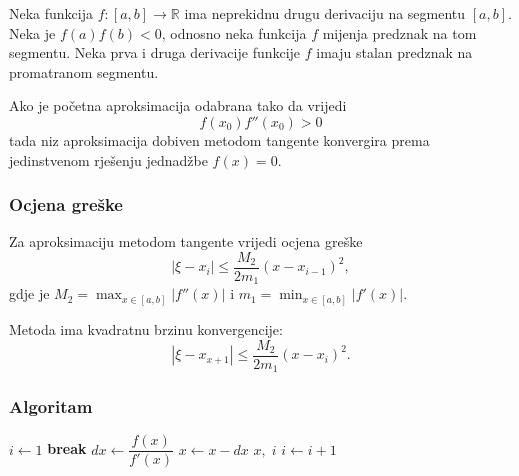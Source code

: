Neka funkcija $f: [a,b] \to \mathbb{R}$ ima neprekidnu drugu derivaciju na
segmentu $[a,b]$. Neka je $f(a)f(b) < 0$, odnosno neka funkcija $f$ mijenja
predznak na tom segmentu.
Neka prva i druga derivacije funkcije $f$ imaju stalan predznak na promatranom
segmentu.

Ako je početna aproksimacija odabrana tako da vrijedi
$$
    f(x_0)f''(x_0) > 0
$$
tada niz aproksimacija dobiven metodom tangente konvergira prema jedinstvenom
rješenju jednadžbe $f(x) = 0$.

\subsubsection{Ocjena greške}

Za aproksimaciju metodom tangente vrijedi ocjena greške
$$
|\xi - x_i| \leq \dfrac{M_2}{2m_1}(x-x_{i-1})^2,
$$
gdje je $M_2 = \max_{x\in [a,b]}|f''(x)|$ i $m_1 = \min_{x\in [a,b]}|f'(x)|$.

Metoda ima kvadratnu brzinu konvergencije:
$$
|\xi - x_{x+1}| \leq \dfrac{M_2}{2m_1}(x-x_i)^2.
$$

\subsubsection{Algoritam}

\begin{algorithmic}
    \Else
        \State $i \gets 1$
                \State \textbf{break} 
            \EndIf
            \State $dx \gets \dfrac{f(x)}{f'(x)}$
            \State $x \gets x - dx$
                \State \Return $x,\;i$
            \Else
                \State $i \gets i + 1$
            \EndIf
        \EndWhile
    \EndIf
\EndFunction
\end{algorithmic}
